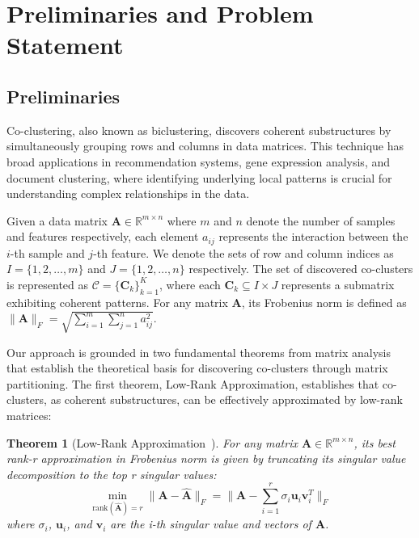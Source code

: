 \documentclass[journal]{IEEEtran}
\newtheorem{theorem}{Theorem}
\renewcommand{\cite}[1]{~\autocite{#1}}
\begin{document}
\section{Preliminaries and Problem Statement}
\label{sec:problem_formulation}
\subsection{Preliminaries}
Co-clustering, also known as biclustering, discovers coherent substructures by simultaneously grouping rows and columns in data matrices. This technique has broad applications in recommendation systems, gene expression analysis, and document clustering, where identifying underlying local patterns is crucial for understanding complex relationships in the data.

Given a data matrix $\mathbf{A} \in \mathbb{R}^{m \times n}$ where $m$ and $n$ denote the number of samples and features respectively, each element $a_{ij}$ represents the interaction between the $i$-th sample and $j$-th feature. We denote the sets of row and column indices as $I = \{1,2,\ldots,m\}$ and $J = \{1,2,\ldots,n\}$ respectively. The set of discovered co-clusters is represented as $\mathcal{C} = \{\mathbf{C}_k\}_{k=1}^K$, where each $\mathbf{C}_k \subseteq I \times J$ represents a submatrix exhibiting coherent patterns. For any matrix $\mathbf{A}$, its Frobenius norm is defined as $\|\mathbf{A}\|_F = \sqrt{\sum_{i=1}^m \sum_{j=1}^n a_{ij}^2}$.

Our approach is grounded in two fundamental theorems from matrix analysis that establish the theoretical basis for discovering co-clusters through matrix partitioning. The first theorem, Low-Rank Approximation, establishes that co-clusters, as coherent substructures, can be effectively approximated by low-rank matrices:

\begin{theorem}[Low-Rank Approximation\cite{eckart1936ApproximationOneMatrix}]
    For any matrix $\mathbf{A} \in \mathbb{R}^{m \times n}$, its best rank-r approximation in Frobenius norm is given by truncating its singular value decomposition to the top r singular values:
    \begin{equation}
        \min_{\text{rank}(\hat{\mathbf{A}})=r} \|\mathbf{A} - \hat{\mathbf{A}}\|_F = \|\mathbf{A} - \sum_{i=1}^r \sigma_i \mathbf{u}_i\mathbf{v}_i^T\|_F
    \end{equation}
    where $\sigma_i$, $\mathbf{u}_i$, and $\mathbf{v}_i$ are the i-th singular value and vectors of $\mathbf{A}$.
\end{theorem}
\end{document}
